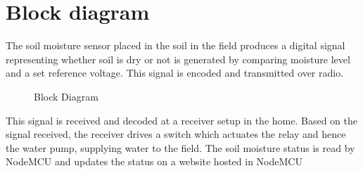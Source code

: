 \section{Block diagram}
The soil moisture sensor placed in the soil in the field produces a
digital signal representing whether soil is dry or not is generated
by comparing moisture level and a set reference voltage. This signal
is encoded and transmitted over radio.

\begin{figure}[ht]
  \centering
  \caption{Block Diagram}
\end{figure}

This signal is received and
decoded at a receiver setup in the home. Based on the signal
received, the receiver drives a switch which actuates the relay and
hence the water pump, supplying water to the field. The soil moisture
status is read by NodeMCU and updates the status on a website hosted in NodeMCU
